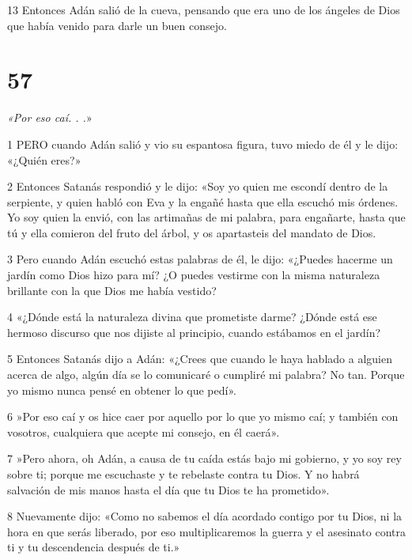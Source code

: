 \par 13 Entonces Adán salió de la cueva, pensando que era uno de los ángeles de Dios que había venido para darle un buen consejo.

\chapter{57}

\par \textit{«Por eso caí. . .}»

\par 1 PERO cuando Adán salió y vio su espantosa figura, tuvo miedo de él y le dijo: «¿Quién eres?»

\par 2 Entonces Satanás respondió y le dijo: «Soy yo quien me escondí dentro de la serpiente, y quien habló con Eva y la engañé hasta que ella escuchó mis órdenes. Yo soy quien la envió, con las artimañas de mi palabra, para engañarte, hasta que tú y ella comieron del fruto del árbol, y os apartasteis del mandato de Dios.

\par 3 Pero cuando Adán escuchó estas palabras de él, le dijo: «¿Puedes hacerme un jardín como Dios hizo para mí? ¿O puedes vestirme con la misma naturaleza brillante con la que Dios me había vestido?

\par 4 «¿Dónde está la naturaleza divina que prometiste darme? ¿Dónde está ese hermoso discurso que nos dijiste al principio, cuando estábamos en el jardín?

\par 5 Entonces Satanás dijo a Adán: «¿Crees que cuando le haya hablado a alguien acerca de algo, algún día se lo comunicaré o cumpliré mi palabra? No tan. Porque yo mismo nunca pensé en obtener lo que pedí».

\par 6 »Por eso caí y os hice caer por aquello por lo que yo mismo caí; y también con vosotros, cualquiera que acepte mi consejo, en él caerá».

\par 7 »Pero ahora, oh Adán, a causa de tu caída estás bajo mi gobierno, y yo soy rey ​​sobre ti; porque me escuchaste y te rebelaste contra tu Dios. Y no habrá salvación de mis manos hasta el día que tu Dios te ha prometido».

\par 8 Nuevamente dijo: «Como no sabemos el día acordado contigo por tu Dios, ni la hora en que serás liberado, por eso multiplicaremos la guerra y el asesinato contra ti y tu descendencia después de ti.»

